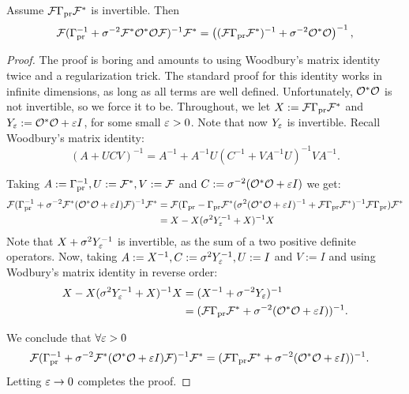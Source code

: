 \documentclass{amsart}
\numberwithin{equation}{section}
\providecommand{\DIFaddbegin}{} %
\begin{document}
\DIFaddbegin \begin{lemma}\label{lemma:twice woodbury}
  Assume $\mathcal{F} \Gamma_{\textup{pr}} \mathcal{F}^*$ is invertible. Then
\begin{align*}
  \begin{split}
    \mathcal{F}( \Gamma_{\textup{pr}}^{-1} + \sigma^{-2}  \mathcal{F}^* \mathcal{O}^* \mathcal{O} \mathcal{F} )^{-1} \mathcal{F}^* 
    = \left ( (\mathcal{F}\Gamma_{\textup{pr}}\mathcal{F}^*)^{-1} + \sigma^{-2}  \mathcal{O}^* \mathcal{O} \right )^{-1},
  \end{split}
\end{align*}  
\end{lemma}
\begin{proof}
  The proof is boring and amounts to using Woodbury's matrix identity
  twice and a regularization trick. The standard proof for this
  identity works in infinite dimensions, as long as all terms are well
  defined. Unfortunately, $\mathcal{O}^*\mathcal{O}$ is not invertible, so we force
  it to be. Throughout, we let $X := \mathcal{F}\Gamma_{\textup{pr}} \mathcal{F}^*$ and $Y_{\varepsilon}
  := \mathcal{O}^*\mathcal{O} + \varepsilon I$, for some small $\varepsilon > 0$. Note that now
  $Y_{\varepsilon}$ is invertible. Recall Woodbury's matrix identity:
  $$
  (A + UCV)^{-1} = A^{-1} + A^{-1}U(C^{-1} + VA^{-1}U)^{-1}VA^{-1}.
  $$

  Taking $A := \Gamma_{\textup{pr}}^{-1}, U := \mathcal{F}^*, V := \mathcal{F}$ and $C :=
  \sigma^{-2} (\mathcal{O}^*\mathcal{O}+\varepsilon I)$ we get:
  \begin{align*}
    \begin{split}
      \mathcal{F}( \Gamma_{\textup{pr}}^{-1} + \sigma^{-2}  \mathcal{F}^* (\mathcal{O}^* \mathcal{O} +\varepsilon I) \mathcal{F} )^{-1}\mathcal{F}^* &=
      \mathcal{F} ( \Gamma_{\textup{pr}} - \Gamma_{\textup{pr}} \mathcal{F}^* ( \sigma^2(\mathcal{O}^*\mathcal{O} + \varepsilon I)^{-1} + \mathcal{F} \Gamma_{\textup{pr}} \mathcal{F}^* )^{-1} \mathcal{F} \Gamma_{\textup{pr}} ) \mathcal{F}^* \\
      &= X - X(\sigma^2Y_{\varepsilon}^{-1} + X)^{-1}X
    \end{split}
  \end{align*}
  Note that $X + \sigma^2 Y_{\varepsilon}^{-1}$ is invertible, as the sum of
  a two positive definite operators. Now, taking $A := X^{-1}, C :=
  \sigma^2Y_{\varepsilon}^{-1}, U := I$ and $V := I$ and using Wodbury's matrix
  identity in reverse order:
  \begin{align*}
    \begin{split}
      X - X(\sigma^2Y_{\varepsilon}^{-1} + X)^{-1}X &= (X^{-1} + \sigma^{-2}Y_{\varepsilon})^{-1} \\
      &= (\mathcal{F} \Gamma_{\textup{pr}} \mathcal{F}^* + \sigma^{-2} (\mathcal{O}^*\mathcal{O} + \varepsilon I))^{-1}.
    \end{split}
  \end{align*}

  We conclude that $\forall \varepsilon > 0$
  \begin{align*}
    \begin{split}
      \mathcal{F}( \Gamma_{\textup{pr}}^{-1} + \sigma^{-2}  \mathcal{F}^* (\mathcal{O}^* \mathcal{O} +\varepsilon I) \mathcal{F} )^{-1}\mathcal{F}^* 
     &= (\mathcal{F} \Gamma_{\textup{pr}} \mathcal{F}^* + \sigma^{-2} (\mathcal{O}^*\mathcal{O} + \varepsilon I))^{-1}.
    \end{split}
  \end{align*}
  Letting $\varepsilon \to 0$ completes the proof.
\end{proof}
\end{document}
